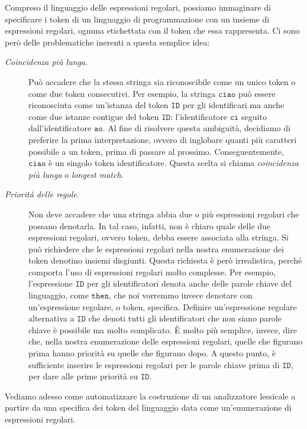 %
Compreso il linguaggio delle espressioni regolari, possiamo immaginare di
specificare i token di un linguaggio di programmazione con un insieme di
espressioni regolari, ognuna etichettata con il token che essa rappresenta.
Ci sono per\`o delle problematiche inerenti a questa semplice idea:
%
\begin{description}
\item[\textit{Coincidenza pi\`u lunga}.]
  Pu\`o accadere che la stessa stringa sia
  riconoscibile come un unico token o come due token consecutivi. Per esempio,
  la stringa $\mathtt{ciao}$ pu\`o essere riconosciuta come un'istanza del
  token $\mathtt{ID}$ per gli identificari ma anche come due istanze contigue
  del token $\mathtt{ID}$: l'identificatore $\mathtt{ci}$ seguito
  dall'identificatore
  $\mathtt{ao}$. Al fine di risolvere questa ambiguit\`a, decidiamo di
  preferire la prima interpretazione, ovvero di inglobare quanti pi\`u
  caratteri possibile a un token, prima di passare al prossimo.
  Conseguentemente, $\mathtt{ciao}$ \`e un singolo token identificatore.
  Questa scelta si chiama \emph{coincidenza pi\`u lunga} o
  \emph{longest match}.
\item[\textit{Priorit\`a delle regole}.]
  Non deve accadere che una stringa abbia due o pi\`u espressioni
  regolari che possano denotarla. In tal caso, infatti, non \`e chiaro
  quale delle due espressioni regolari, ovvero token, debba essere associata
  alla stringa. Si pu\`o richiedere che le espressioni regolari nella nostra
  enumerazione dei token denotino insiemi disgiunti. Questa richiesta \`e
  per\`o irrealistica, perch\'e comporta l'uso di espressioni regolari
  molto complesse. Per esempio, l'espressione $\mathtt{ID}$ per gli
  identificatori
  denota anche delle parole chiave del linguaggio, come $\mathtt{then}$, che
  noi vorremmo invece denotare con un'espressione regolare, o token, specifica.
  Definire un'espressione regolare alternativa a $\mathtt{ID}$ che denoti tutti
  gli identificatori che non siano parole chiave \`e possibile ma molto
  complicato. \`E molto pi\`u semplice, invece, dire che, nella nostra
  enumerazione delle espressioni regolari, quelle che
  figurano prima hanno priorit\`a su quelle che figurano dopo. A questo punto,
  \`e sufficiente inserire le espressioni regolari per le parole chiave
  prima di $\mathtt{ID}$, per dare alle prime priorit\`a su $\mathtt{ID}$.
\end{description}

Vediamo adesso come automatizzare la costruzione di un analizzatore
lessicale a partire da una specifica dei token del linguaggio data come
un'enumerazione di espressioni regolari.
%
